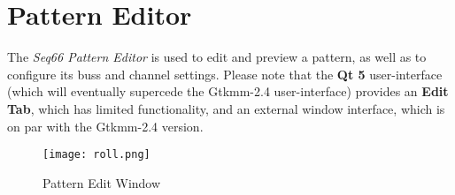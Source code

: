 %
%

\section{Pattern Editor}
\label{sec:pattern_editor}

   The \textsl{Seq66 Pattern Editor} is used to edit and preview a
   pattern, as well as to configure its buss and channel settings.
   Please note that the \textbf{Qt 5} user-interface (which will eventually
   supercede the Gtkmm-2.4 user-interface) provides an \textbf{Edit Tab}, which
   has limited functionality, and an external window interface, which is on par
   with the Gtkmm-2.4 version.


\begin{figure}[H]
   \centering 
   \texttt{[image: roll.png]}
   \caption{Pattern Edit Window}
   \label{fig:pattern_edit_window}
\end{figure}


